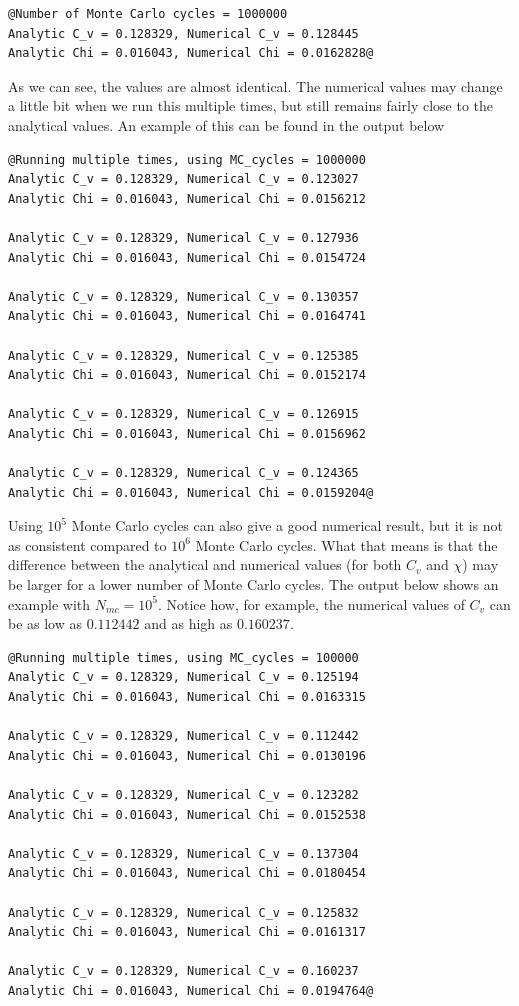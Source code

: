 \documentclass[12pt]{article}
\begin{document}
\begin{lstlisting}
@Number of Monte Carlo cycles = 1000000
Analytic C_v = 0.128329, Numerical C_v = 0.128445
Analytic Chi = 0.016043, Numerical Chi = 0.0162828@
\end{lstlisting}
As we can see, the values are almost identical. The numerical values may change a little bit when we run this multiple times, but still remains fairly close to the analytical values. An example of this can be found in the output below
\begin{lstlisting}
@Running multiple times, using MC_cycles = 1000000
Analytic C_v = 0.128329, Numerical C_v = 0.123027
Analytic Chi = 0.016043, Numerical Chi = 0.0156212
 
Analytic C_v = 0.128329, Numerical C_v = 0.127936
Analytic Chi = 0.016043, Numerical Chi = 0.0154724
 
Analytic C_v = 0.128329, Numerical C_v = 0.130357
Analytic Chi = 0.016043, Numerical Chi = 0.0164741
 
Analytic C_v = 0.128329, Numerical C_v = 0.125385
Analytic Chi = 0.016043, Numerical Chi = 0.0152174
 
Analytic C_v = 0.128329, Numerical C_v = 0.126915
Analytic Chi = 0.016043, Numerical Chi = 0.0156962
 
Analytic C_v = 0.128329, Numerical C_v = 0.124365
Analytic Chi = 0.016043, Numerical Chi = 0.0159204@
\end{lstlisting}
Using $10^5$ Monte Carlo cycles can also give a good numerical result, but it is not as consistent compared to $10^6$ Monte Carlo cycles. What that means is that the difference between the analytical and numerical values (for both $C_v$ and $\chi$) may be larger for a lower number of Monte Carlo cycles. The output below shows an example with $N_{mc} = 10^5$. Notice how, for example, the numerical values of $C_v$ can be as low as $0.112442$ and as high as $0.160237$.
\begin{lstlisting}
@Running multiple times, using MC_cycles = 100000
Analytic C_v = 0.128329, Numerical C_v = 0.125194
Analytic Chi = 0.016043, Numerical Chi = 0.0163315
 
Analytic C_v = 0.128329, Numerical C_v = 0.112442
Analytic Chi = 0.016043, Numerical Chi = 0.0130196
 
Analytic C_v = 0.128329, Numerical C_v = 0.123282
Analytic Chi = 0.016043, Numerical Chi = 0.0152538
 
Analytic C_v = 0.128329, Numerical C_v = 0.137304
Analytic Chi = 0.016043, Numerical Chi = 0.0180454
 
Analytic C_v = 0.128329, Numerical C_v = 0.125832
Analytic Chi = 0.016043, Numerical Chi = 0.0161317
 
Analytic C_v = 0.128329, Numerical C_v = 0.160237
Analytic Chi = 0.016043, Numerical Chi = 0.0194764@
\end{lstlisting}
\end{document}
